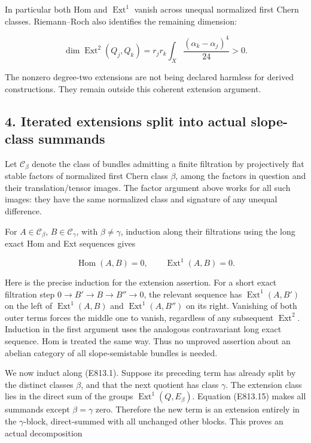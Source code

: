 In particular both Hom and \(\operatorname{Ext}^1\) vanish across
unequal normalized first Chern classes. Riemann--Roch also identifies
the remaining dimension:

\[
 \dim\operatorname{Ext}^2(Q_j,Q_k)
   =r_jr_k\int_X\frac{(\alpha_k-\alpha_j)^4}{24}>0.
 \tag{E813.14}
\]

The nonzero degree-two extensions are not being declared harmless for
derived constructions. They remain outside this coherent extension
argument.

\subsection{4. Iterated extensions split into actual slope-class
summands}\label{SF-E813-iterated-extensions-split-into-actual-slope-class-summands}

Let \(\mathcal C_\beta\) denote the class of bundles admitting a finite
filtration by projectively flat stable factors of normalized first Chern
class \(\beta\), among the factors in question and their
translation/tensor images. The factor argument above works for all such
images: they have the same normalized class and signature of any unequal
difference.

For \(A\in\mathcal C_\beta\), \(B\in\mathcal C_\gamma\), with
\(\beta\ne\gamma\), induction along their filtrations using the long
exact Hom and Ext sequences gives

\[
 \operatorname{Hom}(A,B)=0,
 \qquad \operatorname{Ext}^1(A,B)=0.
 \tag{E813.15}
\]

Here is the precise induction for the extension assertion. For a short
exact filtration step \(0\to B'\to B\to B''\to0\), the relevant sequence
has \(\operatorname{Ext}^1(A,B')\) on the left of
\(\operatorname{Ext}^1(A,B)\) and \(\operatorname{Ext}^1(A,B'')\) on its
right. Vanishing of both outer terms forces the middle one to vanish,
regardless of any subsequent \(\operatorname{Ext}^2\). Induction in the
first argument uses the analogous contravariant long exact sequence. Hom
is treated the same way. Thus no unproved assertion about an abelian
category of all slope-semistable bundles is needed.

We now induct along (E813.1). Suppose its preceding term has already
split by the distinct classes \(\beta\), and that the next quotient has
class \(\gamma\). The extension class lies in the direct sum of the
groups \(\operatorname{Ext}^1(Q, E_\beta)\). Equation (E813.15) makes
all summands except \(\beta=\gamma\) zero. Therefore the new term is an
extension entirely in the \(\gamma\)-block, direct-summed with all
unchanged other blocks. This proves an actual decomposition

